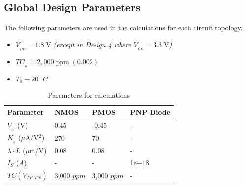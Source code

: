 \documentclass[conference]{IEEEtran}
\begin{document}
\subsection{Global Design Parameters}
The following parameters are used in the calculations for each circuit topology.
\begin{itemize}
  \item $V_{_{DD}} = 1.8\;\mathrm{V}$ \emph{(except in Design 4 where $V_{_{DD}} = 3.3\;\mathrm{V}$)}
  \item $TC_{_R} = 2,000\;\mathrm{ppm}\;(0.002)$
	\item $T_0 = 20\;^{\circ} C$
\end{itemize}
\begin{table}[!htbp]
  \caption[]{Parameters for calculations}
  \label{tab:parameters}
  \centering
  \begin{tabular}{|l|l|l|l|}
    \hline
    Parameter                       & NMOS    & PMOS	&PNP Diode     \\ \hline
    $V_{_{to}}$ (V)                   & 0.45    & -0.45	&-      \\ 
    $K_{_n}$ ($\mu$A/V$^2$)               & 270     & 70 	&-        \\ 
    ${\lambda}{\cdot}L$ ($\mu$m/V)  & 0.08    & 0.08	&-       \\
    $I_S$ ($A$)				&-	&-	&1e$-18$\\
    $TC(V_{TP,TN})$		&3,000 $ppm$ &3,000 $ppm$	&-	\\
    \hline
  \end{tabular}
\end{table}
\newpage
\end{document}
